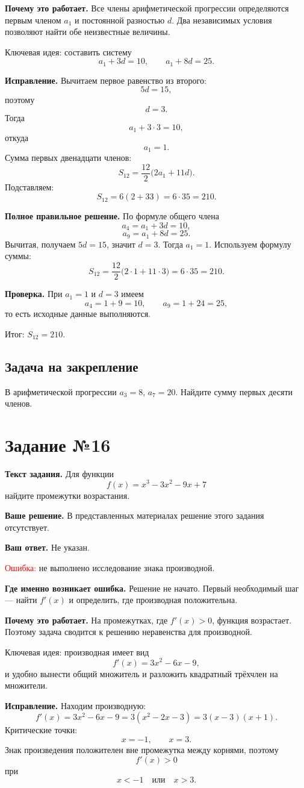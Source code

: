 \documentclass[12pt,a4paper]{article}
\newcommand{\err}{\textcolor{red}{Ошибка:}}
\newcommand{\idea}{\textcolor{blue!60!black}{Ключевая идея:}}
\newcommand{\result}{\textcolor{teal!60!black}{Итог:}}
\newcommand{\tasktitle}[1]{\phantomsection\label{task:#1}\section*{Задание №#1}}
\begin{document}
\textbf{Почему это работает.} Все члены арифметической прогрессии определяются первым членом $a_1$ и постоянной разностью $d$. Два независимых условия позволяют найти обе неизвестные величины.

\idea{} составить систему
\[
a_1+3d=10,
\qquad
a_1+8d=25.
\]

\textbf{Исправление.} Вычитаем первое равенство из второго:
\[
5d=15,
\]
поэтому
\[
d=3.
\]
Тогда
\[
a_1+3\cdot3=10,
\]
откуда
\[
a_1=1.
\]
Сумма первых двенадцати членов:
\[
S_{12}=\frac{12}{2}\bigl(2a_1+11d\bigr).
\]
Подставляем:
\[
S_{12}=6(2+33)=6\cdot35=210.
\]

\textbf{Полное правильное решение.} По формуле общего члена
\[
a_4=a_1+3d=10,
\]
\[
a_9=a_1+8d=25.
\]
Вычитая, получаем $5d=15$, значит $d=3$. Тогда $a_1=1$. Используем формулу суммы:
\[
S_{12}=\frac{12}{2}\bigl(2\cdot1+11\cdot3\bigr)=6\cdot35=210.
\]

\textbf{Проверка.} При $a_1=1$ и $d=3$ имеем
\[
a_4=1+9=10,
\qquad
a_9=1+24=25,
\]
то есть исходные данные выполняются.

\result{} $S_{12}=210$.

\subsection*{Задача на закрепление}
В арифметической прогрессии $a_3=8$, $a_7=20$. Найдите сумму первых десяти членов.

\newpage
\tasktitle{16}
\textbf{Текст задания.} Для функции
\[
f(x)=x^3-3x^2-9x+7
\]
найдите промежутки возрастания.

\textbf{Ваше решение.} В представленных материалах решение этого задания отсутствует.

\textbf{Ваш ответ.} Не указан.

\err{} не выполнено исследование знака производной.

\textbf{Где именно возникает ошибка.} Решение не начато. Первый необходимый шаг --- найти $f'(x)$ и определить, где производная положительна.

\textbf{Почему это работает.} На промежутках, где $f'(x)>0$, функция возрастает. Поэтому задача сводится к решению неравенства для производной.

\idea{} производная имеет вид
\[
f'(x)=3x^2-6x-9,
\]
и удобно вынести общий множитель и разложить квадратный трёхчлен на множители.

\textbf{Исправление.} Находим производную:
\[
f'(x)=3x^2-6x-9=3(x^2-2x-3)=3(x-3)(x+1).
\]
Критические точки:
\[
x=-1,\qquad x=3.
\]
Знак произведения положителен вне промежутка между корнями, поэтому
\[
f'(x)>0
\]
при
\[
x<-1\quad\text{или}\quad x>3.
\]
\end{document}
